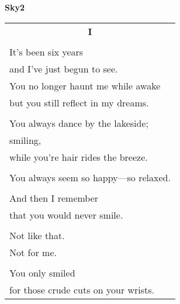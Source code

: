 \documentclass{article}
\begin{document}
%
%
%
%
%
%

\newcommand{\h}{\hspace*{2ex}}
\newcommand{\HHHH}{\hspace*{32ex}}
\begin{center}
{\large\textbf{Sky2}} \\
\begin{tabular}{l}
\multicolumn{1}{c}{\large\textbf{I}} \\
\\
It's been six years \\
\h and I've just begun to see. \\
You no longer haunt me while awake \\
\h but you still reflect in my dreams. \\
\\
You always dance by the lakeside; \\
\h smiling, \\
\h\h while you're hair rides the breeze. \\
\\
You always seem so happy---so relaxed. \\
\\
And then I remember \\
\h that you would never smile. \\
\\
Not like that. \\
Not for me. \\
\\
You only smiled \\
\h for those crude cuts on your wrists. \\

\end{tabular}
\end{center}
\end{document}
